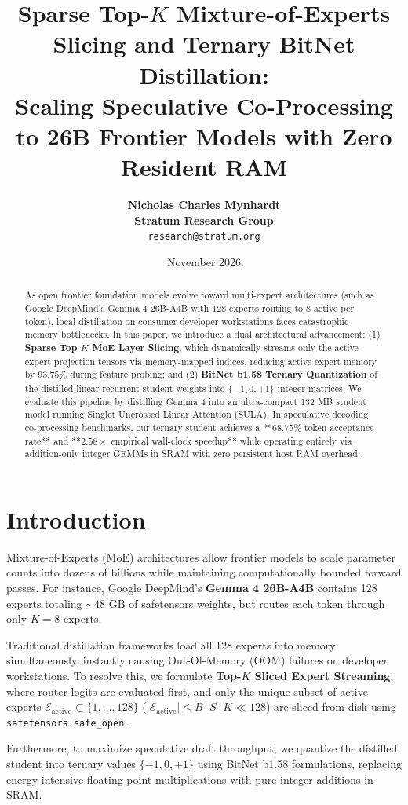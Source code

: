 \documentclass[11pt,a4paper]{article}
\title{\textbf{Sparse Top-$K$ Mixture-of-Experts Slicing and Ternary BitNet Distillation: \\ Scaling Speculative Co-Processing to 26B Frontier Models with Zero Resident RAM}}
\author{
  \textbf{Nicholas Charles Mynhardt} \\
  \textbf{Stratum Research Group} \\
    \texttt{research@stratum.org}
}
\date{November 2026}
\begin{document}
\maketitle

\begin{abstract}
As open frontier foundation models evolve toward multi-expert architectures (such as Google DeepMind's Gemma 4 26B-A4B with 128 experts routing to 8 active per token), local distillation on consumer developer workstations faces catastrophic memory bottlenecks. In this paper, we introduce a dual architectural advancement: (1) \textbf{Sparse Top-$K$ MoE Layer Slicing}, which dynamically streams only the active expert projection tensors via memory-mapped indices, reducing active expert memory by $93.75\%$ during feature probing; and (2) \textbf{BitNet b1.58 Ternary Quantization} of the distilled linear recurrent student weights into $\{-1, 0, +1\}$ integer matrices. We evaluate this pipeline by distilling Gemma 4 into an ultra-compact 132 MB student model running Singlet Uncrossed Linear Attention (SULA). In speculative decoding co-processing benchmarks, our ternary student achieves a **$68.75\%$ token acceptance rate** and **$2.58\times$ empirical wall-clock speedup** while operating entirely via addition-only integer GEMMs in SRAM with zero persistent host RAM overhead.
\end{abstract}

\section{Introduction}
Mixture-of-Experts (MoE) architectures allow frontier models to scale parameter counts into dozens of billions while maintaining computationally bounded forward passes. For instance, Google DeepMind's \textbf{Gemma 4 26B-A4B} contains 128 experts totaling $\sim 48\text{ GB}$ of safetensors weights, but routes each token through only $K=8$ experts.

Traditional distillation frameworks load all 128 experts into memory simultaneously, instantly causing Out-Of-Memory (OOM) failures on developer workstations. To resolve this, we formulate \textbf{Top-$K$ Sliced Expert Streaming}, where router logits are evaluated first, and only the unique subset of active experts $\mathcal{E}_{\text{active}} \subset \{1, \dots, 128\}$ ($|\mathcal{E}_{\text{active}}| \le B \cdot S \cdot K \ll 128$) are sliced from disk using \texttt{safetensors.safe\_open}.

Furthermore, to maximize speculative draft throughput, we quantize the distilled student into ternary values $\{-1, 0, +1\}$ using BitNet b1.58 formulations, replacing energy-intensive floating-point multiplications with pure integer additions in SRAM.
\end{document}
